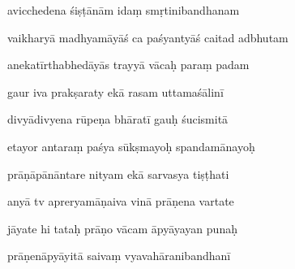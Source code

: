 \documentclass[article,12pt,a4paper]{memoir}%
\newcounter{parCount}
\begin{document}
	  
	  \pstart \leavevmode%
	avicchedena śiṣṭānām idaṃ smṛtinibandhanam 
	{}
	\pend%
      

	  
	  \pstart {} vaikharyā madhyamāyāś ca paśyantyāś caitad adbhutam 
	{}
	\pend%
      

	  
	  \pstart \leavevmode%
	anekatīrthabhedāyās trayyā vācaḥ paraṃ padam 
	{}
	\pend%
      

	  
	  \pstart {} gaur iva prakṣaraty ekā rasam uttamaśālinī 
	{}
	\pend%
      

	  
	  \pstart \leavevmode%
	divyādivyena rūpeṇa bhāratī gauḥ śucismitā 
	{}
	\pend%
      

	  
	  \pstart {} etayor antaraṃ paśya sūkṣmayoḥ spandamānayoḥ 
	{}
	\pend%
      

	  
	  \pstart \leavevmode%
	prāṇāpānāntare nityam ekā sarvasya tiṣṭhati 
	{}
	\pend%
      

	  
	  \pstart {} anyā tv apreryamāṇaiva vinā prāṇena vartate 
	{}
	\pend%
      

	  
	  \pstart \leavevmode%
	jāyate hi tataḥ prāṇo vācam āpyāyayan punaḥ 
	{}
	\pend%
      

	  
	  \pstart {} prāṇenāpyāyitā saivaṃ vyavahāranibandhanī 
	{}
	\pend%
      
\end{document}
